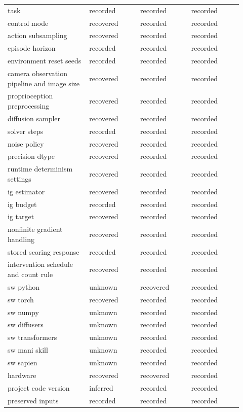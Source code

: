 \begin{longtable}{p{0.320\linewidth} p{0.200\linewidth} p{0.200\linewidth} p{0.200\linewidth}}
task & recorded & recorded & recorded \\
control mode & recovered & recorded & recorded \\
action subsampling & recovered & recorded & recorded \\
episode horizon & recorded & recorded & recorded \\
environment reset seeds & recorded & recorded & recorded \\
camera observation pipeline and image size & recovered & recorded & recorded \\
proprioception preprocessing & recovered & recorded & recorded \\
diffusion sampler & recovered & recorded & recorded \\
solver steps & recorded & recorded & recorded \\
noise policy & recovered & recorded & recorded \\
precision dtype & recovered & recorded & recorded \\
runtime determinism settings & recovered & recorded & recorded \\
ig estimator & recovered & recorded & recorded \\
ig budget & recorded & recorded & recorded \\
ig target & recovered & recorded & recorded \\
nonfinite gradient handling & recovered & recorded & recorded \\
stored scoring response & recorded & recorded & recorded \\
intervention schedule and count rule & recovered & recorded & recorded \\
sw python & unknown & recovered & recorded \\
sw torch & recovered & recorded & recorded \\
sw numpy & unknown & recorded & recorded \\
sw diffusers & unknown & recorded & recorded \\
sw transformers & unknown & recorded & recorded \\
sw mani skill & unknown & recorded & recorded \\
sw sapien & unknown & recorded & recorded \\
hardware & recovered & recovered & recorded \\
project code version & inferred & recorded & recorded \\
preserved inputs & recorded & recorded & recorded \\
\end{longtable}

